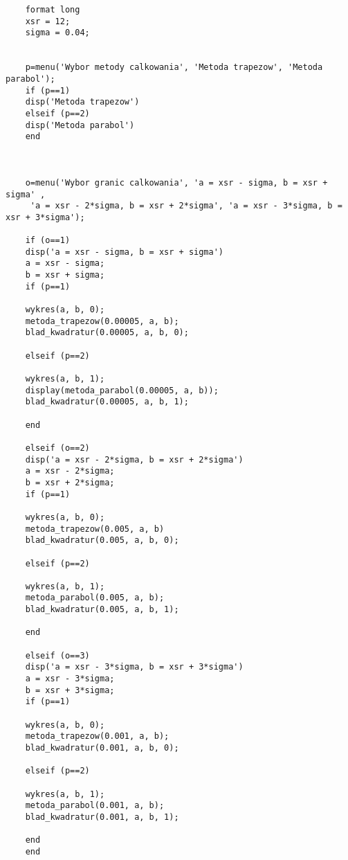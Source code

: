 \documentclass{article}
\begin{document}
	\begin{lstlisting}
	format long
	xsr = 12;
	sigma = 0.04;
	

	p=menu('Wybor metody calkowania', 'Metoda trapezow', 'Metoda parabol'); 
	if (p==1) 
	disp('Metoda trapezow') 
	elseif (p==2) 
	disp('Metoda parabol') 
	end  
	
	
	
	o=menu('Wybor granic calkowania', 'a = xsr - sigma, b = xsr + sigma' ,
	 'a = xsr - 2*sigma, b = xsr + 2*sigma', 'a = xsr - 3*sigma, b = xsr + 3*sigma'); 
	
	if (o==1) 
	disp('a = xsr - sigma, b = xsr + sigma') 
	a = xsr - sigma;
	b = xsr + sigma;
	if (p==1) 
	
	wykres(a, b, 0);
	metoda_trapezow(0.00005, a, b);
	blad_kwadratur(0.00005, a, b, 0);
	
	elseif (p==2)
	
	wykres(a, b, 1);
	display(metoda_parabol(0.00005, a, b));
	blad_kwadratur(0.00005, a, b, 1);
	
	end 
	
	elseif (o==2) 
	disp('a = xsr - 2*sigma, b = xsr + 2*sigma') 
	a = xsr - 2*sigma;
	b = xsr + 2*sigma;
	if (p==1) 
	
	wykres(a, b, 0);
	metoda_trapezow(0.005, a, b)
	blad_kwadratur(0.005, a, b, 0);
	
	elseif (p==2)
	
	wykres(a, b, 1);
	metoda_parabol(0.005, a, b);
	blad_kwadratur(0.005, a, b, 1);
	
	end 
	
	elseif (o==3)   
	disp('a = xsr - 3*sigma, b = xsr + 3*sigma') 
	a = xsr - 3*sigma;
	b = xsr + 3*sigma;
	if (p==1) 
	
	wykres(a, b, 0);
	metoda_trapezow(0.001, a, b);
	blad_kwadratur(0.001, a, b, 0);
	
	elseif (p==2)
	
	wykres(a, b, 1);
	metoda_parabol(0.001, a, b);
	blad_kwadratur(0.001, a, b, 1);
	
	end 
	end
	\end{lstlisting}
\end{document}
